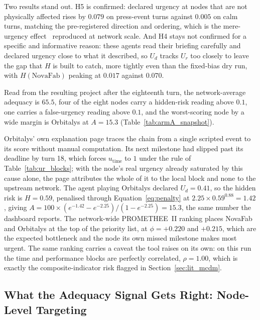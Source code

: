Two results stand out. H5 is confirmed: declared urgency at nodes that are not physically
affected rises by $0.079$ on press-event turns against $0.005$ on calm turns, matching the
pre-registered direction and ordering, which is the mere-urgency
effect~\autocite{zhu2018mere} reproduced at network scale. And H4 stays not confirmed for a
specific and informative reason: these agents read their briefing carefully and declared
urgency close to what it described, so $U_d$ tracks $U_r$ too closely to leave the gap that
$H$ is built to catch, more tightly even than the fixed-bias dry run, with
$H(\text{NovaFab})$ peaking at $0.017$ against $0.070$.

Read from the resulting project after the eighteenth turn, the network-average adequacy is
$65.5$, four of the eight nodes carry a hidden-risk reading above $0.1$, one carries a
false-urgency reading above $0.1$, and the worst-scoring node by a wide margin is Orbitalys at
$A = 15.3$ (Table~\ref{tab:armA_snapshot}).

Orbitalys' own explanation page traces the chain from a single scripted event to its score
without manual computation. Its next milestone had slipped past its deadline by turn 18,
which forces $u_{\text{time}}$ to $1$ under the rule of Table~\ref{tab:ur_blocks}; with the
node's real urgency already saturated by this cause alone, the page attributes the whole of
it to the local block and none to the upstream network. The agent playing Orbitalys declared
$U_d = 0.41$, so the hidden risk is $H = 0.59$, penalised through
Equation~\ref{eq:penalty} at $2.25 \times 0.59^{0.88} = 1.42$, giving
$A = 100 \times (e^{-1.42}-e^{-2.25})/(1-e^{-2.25}) = 15.3$, the same number the dashboard
reports. The network-wide PROMETHEE~II ranking places NovaFab and Orbitalys at the top of
the priority list, at $\phi = +0.220$ and $+0.215$, which are the expected bottleneck and
the node its own missed milestone makes most urgent. The same ranking carries a caveat the
tool raises on its own: on this run the time and performance blocks are perfectly
correlated, $\rho = 1.00$, which is exactly the composite-indicator risk flagged in
Section~\ref{sec:lit_mcdm}.

\subsection{What the Adequacy Signal Gets Right: Node-Level Targeting}
\label{sec:res_targeting}

